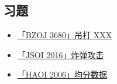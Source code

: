 \hr

\subsection{习题}

\begin{itemize}
\item \href{https://www.lydsy.com/JudgeOnline/problem.php?id=3680}{「BZOJ 3680」吊打 XXX}
\item \href{https://www.lydsy.com/JudgeOnline/problem.php?id=4852}{「JSOI 2016」炸弹攻击}
\item \href{https://www.lydsy.com/JudgeOnline/problem.php?id=2428}{「HAOI 2006」均分数据}
\end{itemize}
